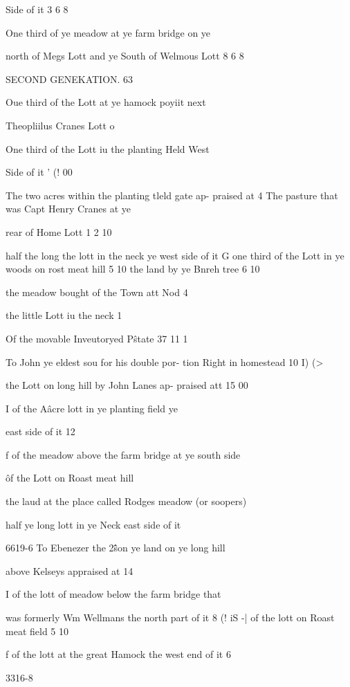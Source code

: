 Side of it 3  6  8 

One third of ye meadow at ye farm bridge on ye 

north of Megs Lott and ye South of Welmous Lott 8  6  8 



SECOND GENEKATION. 63 

Oue third of the Lott at ye hamock poyiit next 

Theopliilus Cranes Lott o   

One third of the Lott iu the planting Held West 

Side of it ' (! 00 

The two acres within the planting tleld gate ap- 
praised at 4   
The pasture that was Capt Henry Cranes at ye 

rear of Home Lott 1 2  10  

half the long the lott in the neck ye west side of it G   
one third of the Lott in ye woods on rost meat hill 5  10  
the land by ye Bnreh tree 6  10  

the meadow bought of the Town att Nod 4   

the little Lott iu the neck 1   

Of the movable Inveutoryed P\^state 37  11  1 

To John ye eldest sou for his double por- 
tion Right in homestead 10  I)  (> 

the Lott on long hill by John Lanes ap- 
praised att 15  00 

I of the A\^ acre lott in ye planting field ye 

east side of it 12   

f of the meadow above the farm bridge at 
ye south side 

\^ of the Lott on Roast meat hill 

the laud at the place called Rodges meadow 
(or soopers) 

half ye long lott in ye Neck east side of it 

6619-6 
To Ebenezer the 2\^\^ son ye land on ye long hill 

above Kelseys appraised at 14   

I of the lott of meadow below the farm bridge that 

was formerly Wm Wellmans the north part of it 8  (!  iS 
-| of the lott on Roast meat field 5  10  

f of the lott at the great Hamock the west end of it 6   

3316-8 

